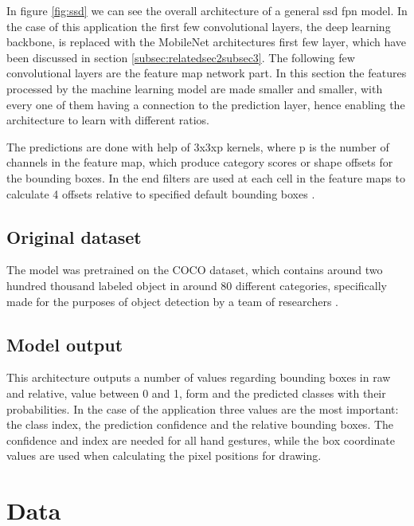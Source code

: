 \par In figure \ref{fig:ssd} we can see the overall architecture of a general ssd fpn model. In the case of this application the first few convolutional layers, the deep learning backbone, is replaced with the MobileNet architectures first few layer, which have been discussed in section \ref{subsec:relatedsec2subsec3}. The following few convolutional layers are the feature map network part. In this section the features processed by the machine learning model are made smaller and smaller, with every one of them having a connection to the prediction layer, hence enabling the architecture to learn with different ratios.
\par The predictions are done with help of 3x3xp kernels, where p is the number of channels in the feature map, which produce category scores or shape offsets for the bounding boxes. In the end filters are used at each cell in the feature maps to calculate 4 offsets relative to specified default bounding boxes \cite{ssd}.

\subsection{Original dataset}
\label{sec:modelsec1subsec2}

\par The model was pretrained on the COCO dataset, which contains around two hundred thousand labeled object in around 80 different categories, specifically made for the purposes of object detection by a team of researchers \cite{coco}.

\subsection{Model output}
\label{sec:modelsec1subsec3}

\par This architecture outputs a number of values regarding bounding boxes in raw and relative, value between 0 and 1, form and the predicted classes with their probabilities. In the case of the application three values are the most important: the class index, the prediction confidence and the relative bounding boxes. The confidence and index are needed for all hand gestures, while the box coordinate values are used when calculating the pixel positions for drawing.

\section{Data}
\label{sec:modelsec2}

